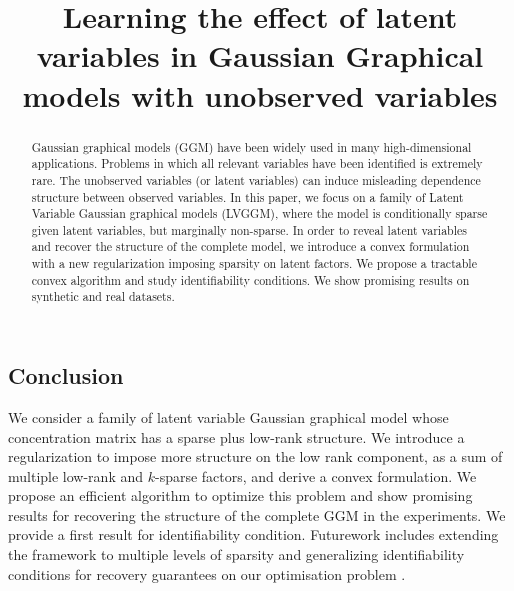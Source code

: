 \documentclass{article}
\title{Learning the effect of latent variables in Gaussian Graphical models with unobserved variables}
\author{
  David S.~Hippocampus\thanks{Use footnote for providing further
    information about author (webpage, alternative
    address)---\emp\documentclass[10pt]{•}h{not} for acknowledging funding agencies.} \\
  Department of Computer Science\\
  Cranberry-Lemon University\\
  Pittsburgh, PA 15213 \\
  \texttt{hippo@cs.cranberry-lemon.edu} \\
}
\begin{document}

\maketitle

\begin{abstract}
Gaussian graphical models (GGM) have been widely used in many high-dimensional applications. Problems in which all relevant variables have been identified is extremely rare. The unobserved variables (or latent variables) can induce misleading dependence structure between observed variables. In this paper, we focus on a family of Latent Variable Gaussian graphical models (LVGGM), where the model is conditionally sparse given latent variables, but marginally non-sparse. In order to reveal latent variables and recover the structure of the complete model, we introduce a convex formulation with a new regularization imposing sparsity on latent factors.  We propose a tractable convex algorithm and study identifiability conditions. We show promising results on synthetic and real datasets.\\
\end{abstract}




 








\subsection*{Conclusion}
We consider a family of latent variable Gaussian graphical model whose concentration matrix has a sparse plus low-rank structure. We introduce a regularization to impose more structure on the low rank component, as a sum of multiple low-rank and $k$-sparse factors, and derive a convex formulation. We propose an efficient algorithm to optimize this problem and show promising results for recovering the structure of the complete GGM in the experiments. We provide a first result for identifiability condition. Futurework includes extending the framework to multiple levels of sparsity and generalizing identifiability conditions for recovery guarantees on our optimisation problem .




\end{document}
